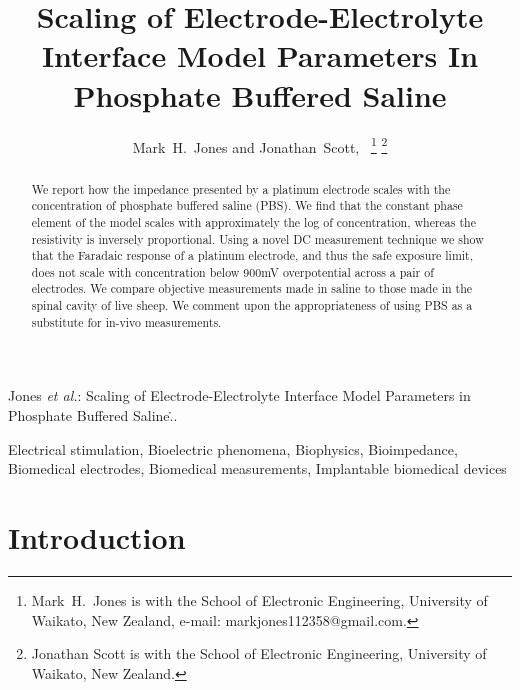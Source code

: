 \documentclass[journal, a4paper]{IEEEtran}
\begin{document}
\title{Scaling of Electrode-Electrolyte Interface Model Parameters In Phosphate Buffered Saline}

\author{Mark~H.~Jones and Jonathan~Scott,~
\thanks{Mark~H.~Jones is with the School of Electronic Engineering, University of Waikato, New Zealand, e-mail: markjones112358@gmail.com.}%
\thanks{Jonathan Scott is with the School of Electronic Engineering, University of Waikato, New Zealand.}
}

{Jones \MakeLowercase{\textit{et al.}}: Scaling of Electrode-Electrolyte Interface Model Parameters in Phosphate Buffered Saline\...}
\maketitle



\begin{abstract}

We report how the impedance presented by a platinum electrode scales with the concentration of phosphate buffered saline (PBS).
We find that the constant phase element of the model scales with approximately the log of concentration, whereas the resistivity is inversely proportional.
Using a novel DC measurement technique we show that the Faradaic response of a platinum electrode, and thus the safe exposure limit, does not scale with concentration below 900\thinspace mV overpotential across a pair of electrodes.
We compare objective measurements made in saline to those made in the spinal cavity of live sheep. We comment upon the appropriateness of using PBS as a substitute for in-vivo measurements.
\end{abstract}

\begin{IEEEkeywords}
    Electrical stimulation, Bioelectric phenomena, Biophysics, Bioimpedance, Biomedical electrodes, Biomedical measurements, Implantable biomedical devices
\end{IEEEkeywords}




\section{Introduction}
\end{document}
